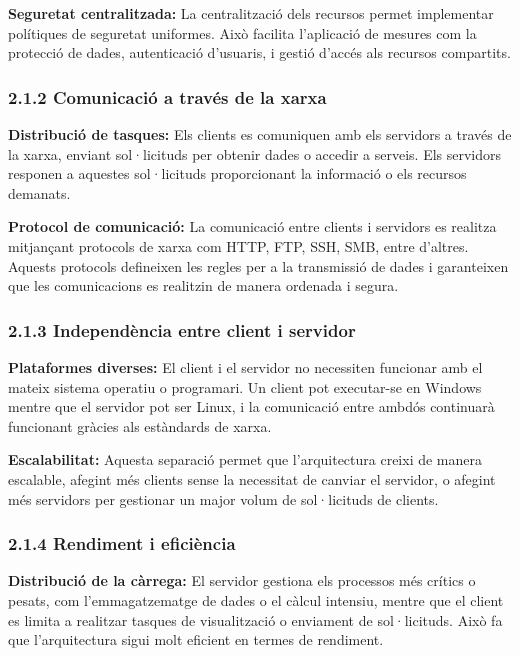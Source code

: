 \documentclass[
  a4paper,
]{article}
\begin{document}
\textbf{Seguretat centralitzada:} La centralització dels recursos permet
implementar polítiques de seguretat uniformes. Això facilita l'aplicació
de mesures com la protecció de dades, autenticació d'usuaris, i gestió
d'accés als recursos compartits.

\subsubsection{2.1.2 Comunicació a través de la
xarxa}\label{comunicaciuxf3-a-travuxe9s-de-la-xarxa}

\textbf{Distribució de tasques:} Els clients es comuniquen amb els
servidors a través de la xarxa, enviant sol·licituds per obtenir dades o
accedir a serveis. Els servidors responen a aquestes sol·licituds
proporcionant la informació o els recursos demanats.

\textbf{Protocol de comunicació:} La comunicació entre clients i
servidors es realitza mitjançant protocols de xarxa com HTTP, FTP, SSH,
SMB, entre d'altres. Aquests protocols defineixen les regles per a la
transmissió de dades i garanteixen que les comunicacions es realitzin de
manera ordenada i segura.

\subsubsection{2.1.3 Independència entre client i
servidor}\label{independuxe8ncia-entre-client-i-servidor}

\textbf{Plataformes diverses:} El client i el servidor no necessiten
funcionar amb el mateix sistema operatiu o programari. Un client pot
executar-se en Windows mentre que el servidor pot ser Linux, i la
comunicació entre ambdós continuarà funcionant gràcies als estàndards de
xarxa.

\textbf{Escalabilitat:} Aquesta separació permet que l'arquitectura
creixi de manera escalable, afegint més clients sense la necessitat de
canviar el servidor, o afegint més servidors per gestionar un major
volum de sol·licituds de clients.

\subsubsection{2.1.4 Rendiment i
eficiència}\label{rendiment-i-eficiuxe8ncia}

\textbf{Distribució de la càrrega:} El servidor gestiona els processos
més crítics o pesats, com l'emmagatzematge de dades o el càlcul
intensiu, mentre que el client es limita a realitzar tasques de
visualització o enviament de sol·licituds. Això fa que l'arquitectura
sigui molt eficient en termes de rendiment.
\end{document}
